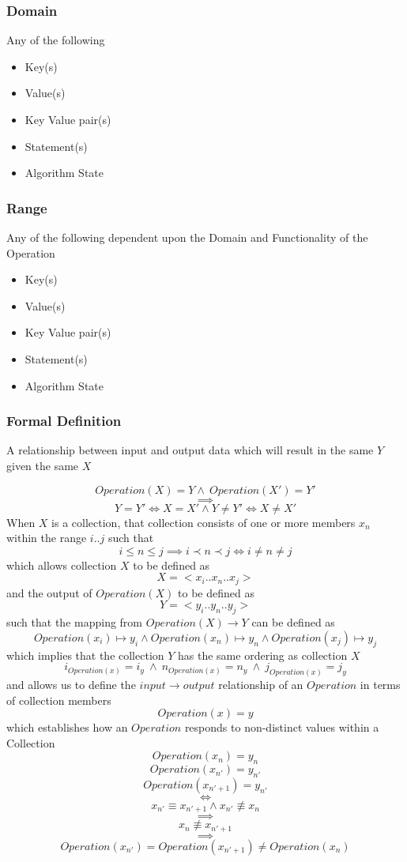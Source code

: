 \documentclass[../main.tex]{subfiles}
\begin{document}
\subsubsection{Domain}

Any of the following
\begin{itemize}
\item Key(s)
\item Value(s)
\item Key Value pair(s)
\item Statement(s)
\item Algorithm State
\end{itemize}

\subsubsection{Range}

Any of the following dependent upon the Domain and Functionality of the Operation

\begin{itemize}
\item Key(s)
\item Value(s)
\item Key Value pair(s)
\item Statement(s)
\item Algorithm State
\end{itemize}

\subsubsection{Formal Definition}

A relationship between input and output data which will result in the same $Y$ given the same $X$

$$Operation(X) = Y \land \ Operation(X') = Y'$$
$$\implies$$
$$Y = Y' \iff X = X'  \land Y \not= Y' \iff X \not= X'$$
When $X$ is a collection, that collection consists of one or more members $x_{n}$ within the range $i..j$ such that
$$i \leq n \leq j  \implies i \prec n \prec j \iff i \not= n \not= j$$
which allows collection $X$ to be defined as
$$X = <x_{i}..x_{n}..x_{j}> $$
and the output of $Operation(X)$ to be defined as
$$Y = <y_{i}..y_{n}..y_{j}>$$
such that the mapping from $Operation(X) \to Y$ can be defined as
$$Operation(x_{i}) \mapsto y_{i} \land Operation(x_{n}) \mapsto y_{n} \land Operation(x_{j}) \mapsto y_{j}$$
which implies that the collection $Y$ has the same ordering as collection $X$
$$ i_{Operation(x)} = i_{y} \ \land \ n_{Operation(x)} = n_{y} \ \land \ j_{Operation(x)} = j_{y} $$
and allows us to define the $input \to output$ relationship of an $Operation$ in terms of collection members
$$Operation(x) = y$$
which establishes how an $Operation$ responds to non-distinct values within a Collection
$$Operation(x_{n}) = y_{n}$$
$$Operation(x_{n'}) = y_{n'}$$
$$Operation(x_{n' + 1}) = y_{n'}$$
$$\iff$$
$$x_{n'} \equiv x_{n'+1} \land x_{n'} \not \equiv x_{n}$$
$$\implies $$
$$x_{n} \not \equiv  x_{n' + 1}$$
$$\implies $$
$$Operation(x_{n'}) = Operation(x_{n' + 1}) \not= Operation(x_{n})$$
\end{document}
